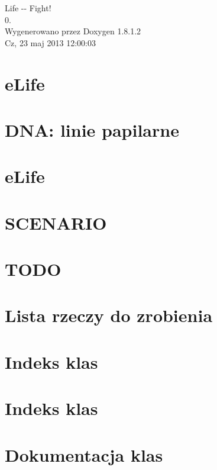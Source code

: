 \documentclass{article}
\begin{document}
\hypersetup{pageanchor=false,citecolor=blue}
\begin{titlepage}
\vspace*{7cm}
\begin{center}
{\Large Life -\/-\/ Fight! \\[1ex]\large 0. }\\
\vspace*{1cm}
{\large Wygenerowano przez Doxygen 1.8.1.2}\\
\vspace*{0.5cm}
{\small Cz, 23 maj 2013 12:00:03}\\
\end{center}
\end{titlepage}
\tableofcontents
{}
\hypersetup{pageanchor=true,citecolor=blue}
\section{e\-Life}
\label{md_func}
\hypertarget{md_func}{}

\section{D\-N\-A\-: linie papilarne}
\label{md_GENETYKA}
\hypertarget{md_GENETYKA}{}

\section{e\-Life}
\label{md_README}
\hypertarget{md_README}{}

\section{S\-C\-E\-N\-A\-R\-I\-O}
\label{md_SCENARIO}
\hypertarget{md_SCENARIO}{}

\section{T\-O\-D\-O}
\label{md_TODO}
\hypertarget{md_TODO}{}

\section{Lista rzeczy do zrobienia}
\label{todo}
\hypertarget{todo}{}

\section{Indeks klas}

\section{Indeks klas}

\section{Dokumentacja klas}






\printindex
\end{document}
